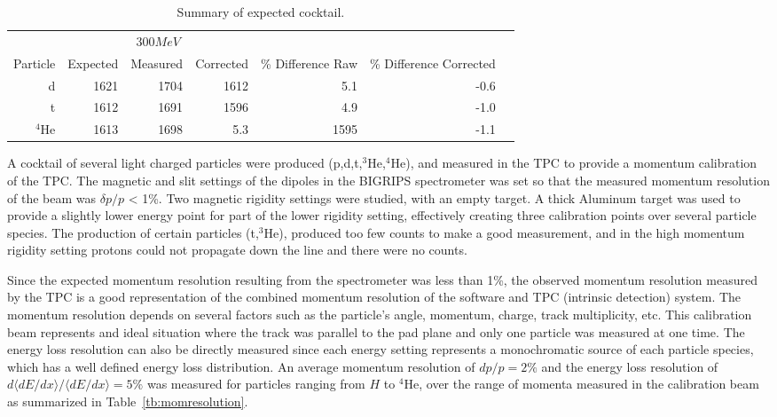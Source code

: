 \begin{table*}\centering
{}
\begin{tabular}{@{}rrrrrrr@{}}\toprule
& \multicolumn{3}{c}{$300 MeV$}\\
\cmidrule{2-4}
Particle & Expected & Measured & Corrected & \% Difference Raw & \% Difference Corrected\\
\midrule
d   & 1621 & 1704 & 1612   &  5.1 & -0.6  \\
t   & 1612 & 1691 & 1596   &  4.9  & -1.0\\
${}^{4}$He   & 1613 & 1698 &  5.3 & 1595  & -1.1\\

\bottomrule
\end{tabular}
\caption{Summary of expected cocktail. }
\label{tb:cocktail300}
\end{table*}

A cocktail of several light charged particles were produced (p,d,t,${}^{3}$He,${}^{4}$He), and measured in the TPC to provide a momentum calibration of the TPC. The magnetic and slit settings of the dipoles in the BIGRIPS spectrometer was set so that the measured momentum resolution of the beam was $\delta p/p$ < 1\%. Two magnetic rigidity settings were studied, with an empty target. A thick Aluminum target was used to provide a slightly lower energy point for part of the lower rigidity setting, effectively creating three calibration points over several particle species. The production of certain particles (t,${}^{3}$He), produced too few counts to make a good measurement, and in the high momentum rigidity setting protons could not propagate down the line and there were no counts. 

Since the expected momentum resolution resulting from the spectrometer was less than 1\%, the observed momentum resolution measured by the TPC is a good representation of the combined momentum resolution of the software and TPC (intrinsic detection) system. The momentum resolution depends on several factors such as the particle's angle, momentum, charge, track multiplicity, etc. This calibration beam represents and ideal situation where the track was parallel to the pad plane and only one particle was measured at one time. The energy loss resolution can also be directly measured since each energy setting represents a monochromatic source of each particle species, which has a well defined energy loss distribution. An average momentum resolution of $dp/p = 2\%$ and the energy loss resolution of $d\langle dE/dx \rangle/\langle dE/dx \rangle = 5\%$ was measured for particles ranging from $H$ to ${}^{4}$He, over the range of momenta measured in the calibration beam as summarized in Table~\ref{tb:momresolution}.

